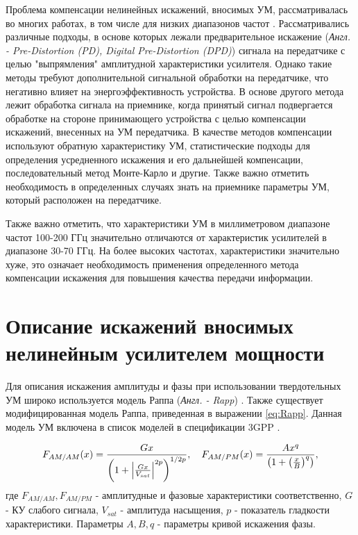 \documentclass{unn}
\begin{document}
Проблема компенсации нелинейных искажений, вносимых УМ, рассматривалась во
многих работах, в том числе для низких диапазонов частот
\cite[]{sharath2015,shabany2008,eda2001,maltsev2021,bhat2016,qi2010,gregorio2007}.
Рассматривались различные подходы, в основе которых лежали предварительное
искажение (\textit{Англ. - Pre-Distortion (PD), Digital Pre-Distortion
(DPD)}) сигнала на передатчике с целью "выпрямления" амплитудной
характеристики усилителя. Однако такие методы требуют дополнительной
сигнальной обработки на передатчике, что негативно влияет на
энергоэффективность устройства. В основе другого метода лежит обработка
сигнала на приемнике, когда принятый сигнал подвергается обработке на
стороне принимающего устройства с целью компенсации искажений, внесенных на
УМ передатчика. В качестве методов компенсации используют обратную
характеристику УМ, статистические подходы для определения усредненного
искажения и его дальнейшей компенсации, последовательный метод Монте-Карло
и другие. Также важно отметить необходимость в определенных случаях знать
на приемнике параметры УМ, который расположен на передатчике.

Также важно отметить, что характеристики УМ в миллиметровом диапазоне
частот 100-200 ГГц значительно отличаются от характеристик усилителей в
диапазоне 30-70 ГГц. На более высоких частотах, характеристики значительно
хуже, это означает необходимость применения определенного метода
компенсации искажения для повышения качества передачи информации.

\section{Описание искажений вносимых нелинейным усилителем мощности}
Для описания искажения амплитуды и фазы при использовании твердотельных УМ
широко используется модель Раппа (\textit{Англ. - Rapp}) \cite{Rapp1991} \cite{Maltsev2010}.
Также существует модифицированная модель Раппа, приведенная в выражении
\ref{eq:Rapp}. Данная модель УМ включена в список моделей в спецификации
3GPP \cite{3gpp.38.803}.

\begin{equation}
    F_{AM/AM}(x) = \frac{G x}{\left( 1 + \abs{\frac{Gx}{V_{sat}}}^{2p}\right)^{1/2p}},
    \quad 
    F_{AM/PM}(x) = \frac{Ax^q}{\left(1+\left(\frac{x}{B}\right)^q\right)},
    \label{eq:Rapp}
\end{equation}
где $F_{AM/AM}, F_{AM/PM}$ - амплитудные и фазовые характеристики
соответственно, $G$ - КУ слабого сигнала, $V_{sat}$ - амплитуда насыщения,
$p$ - показатель гладкости характеристики. Параметры $A,B,q$ - параметры
кривой искажения фазы.
\end{document}
